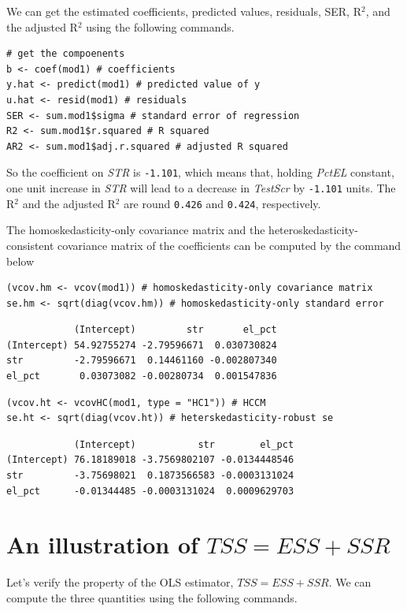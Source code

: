 \documentclass[11pt]{article}
\begin{document}
We can get the estimated coefficients, predicted values, residuals,
SER, R\(^{\text{2}}\), and the adjusted R\(^{\text{2}}\) using the following commands.

\begin{verbatim}
# get the compoenents
b <- coef(mod1) # coefficients
y.hat <- predict(mod1) # predicted value of y
u.hat <- resid(mod1) # residuals
SER <- sum.mod1$sigma # standard error of regression
R2 <- sum.mod1$r.squared # R squared
AR2 <- sum.mod1$adj.r.squared # adjusted R squared
\end{verbatim}

So the coefficient on \emph{STR} is
\texttt{-1.101},
which means that, holding \emph{PctEL} constant, one unit increase in
\emph{STR} will lead to a decrease in \emph{TestScr} by
\texttt{-1.101} units.
The R\(^{\text{2}}\) and the adjusted R\(^{\text{2}}\) are round
\texttt{0.426}
and \texttt{0.424}, respectively.

The homoskedasticity-only covariance matrix and the
heteroskedasticity-consistent covariance matrix of the coefficients
can be computed by the command below
\begin{verbatim}
(vcov.hm <- vcov(mod1)) # homoskedasticity-only covariance matrix
se.hm <- sqrt(diag(vcov.hm)) # homoskedasticity-only standard error
\end{verbatim}

\begin{verbatim}
            (Intercept)         str       el_pct
(Intercept) 54.92755274 -2.79596671  0.030730824
str         -2.79596671  0.14461160 -0.002807340
el_pct       0.03073082 -0.00280734  0.001547836
\end{verbatim}

\begin{verbatim}
(vcov.ht <- vcovHC(mod1, type = "HC1")) # HCCM
se.ht <- sqrt(diag(vcov.ht)) # heterskedasticity-robust se
\end{verbatim}

\begin{verbatim}
            (Intercept)           str        el_pct
(Intercept) 76.18189018 -3.7569802107 -0.0134448546
str         -3.75698021  0.1873566583 -0.0003131024
el_pct      -0.01344485 -0.0003131024  0.0009629703
\end{verbatim}

\section{An illustration of \(TSS = ESS + SSR\)}
\label{sec:orgde6d73d}
Let's verify the property of the OLS estimator, \(TSS = ESS + SSR\). We
can compute the three quantities using the following commands.
\end{document}
